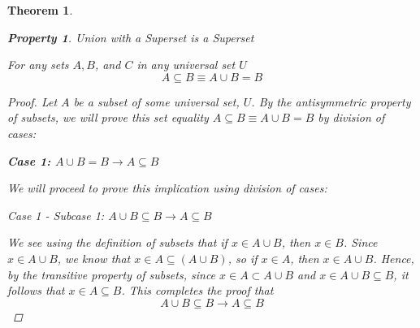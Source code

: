 \documentclass{book}
\newtheorem{theorem}{Theorem}[section]
\newtheorem{property}{Property}[theorem]
\theoremstyle{definition}
\theoremstyle{remark}
\begin{document}
\begin{theorem}
    
    \newpage
    \begin{property}
    Union with a Superset is a Superset  \\
        \begin{tcolorbox}
            For any sets $A, B$, and $C$ in any universal set $U$
                \begin{equation*}
                    A \subseteq B \equiv A \cup B = B
                \end{equation*}
        \end{tcolorbox}
    
        \begin{proof}
        Let $A$ be a subset of some universal set, $U$. By the antisymmetric property of subsets, we will prove this set equality $A \subseteq B \equiv A \cup B = B$ by division of cases: \\
            
            
            \begin{flushleft} \textbf{Case 1: $A \cup B = B \to A \subseteq B$} \end{flushleft}
                We will proceed to prove this implication using division of cases: 
                
                \begin{flushleft} \textit{Case 1 - Subcase 1: $A \cup B \subseteq B \to A \subseteq B$} \end{flushleft}
                    We see using the definition of subsets that if $x \in A \cup B$, then $x \in B$. Since $x \in A \cup B$, we know that $x \in A \subseteq (A \cup B)$, so if $x \in A$, then $x \in A \cup B$. Hence, by the transitive property of subsets, since $x \in A \subset A \cup B$ and $x \in A \cup B \subseteq B$, it follows that $x \in A \subseteq B$. This completes the proof that $$A \cup B \subseteq B \to A \subseteq B$$
                    

\end{proof}
\end{property}
\end{theorem}
\end{document}
